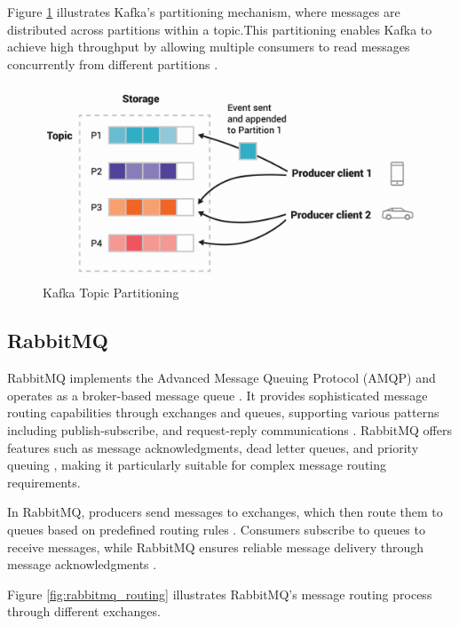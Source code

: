 Figure \ref{fig:kafka_partitioning} illustrates Kafka's partitioning mechanism, where messages are distributed across partitions within a topic.This partitioning enables Kafka to achieve high throughput by allowing multiple consumers to read messages concurrently from different partitions \cite{kafka_parallel}.
\begin{figure}[H]
    \centering
    \includegraphics[width=\textwidth]{figures/kafka_topics_partition.png}
    \caption{Kafka Topic Partitioning \cite{kafka_partitions}} 
    \label{fig:kafka_partitioning}
\end{figure}

\subsection{RabbitMQ}
RabbitMQ implements the Advanced Message Queuing Protocol (AMQP) \cite{rabbitmq_protocols} and operates as a broker-based message queue \cite{rabbitmq_definition}. It provides sophisticated message routing capabilities through exchanges and queues, supporting various patterns including publish-subscribe, and request-reply communications \cite{rabbitmq_routing}. RabbitMQ offers features such as message acknowledgments, dead letter queues, and priority queuing \cite{rabbitmq_routing}, making it particularly suitable for complex message routing requirements.

In RabbitMQ, producers send messages to exchanges, which then route them to queues based on predefined routing rules \cite{rabbitmq_routing}. Consumers subscribe to queues to receive messages, while RabbitMQ ensures reliable message delivery through message acknowledgments \cite{rabbitmq_ack}. 

Figure \ref{fig:rabbitmq_routing} illustrates RabbitMQ's message routing process through different exchanges. 

